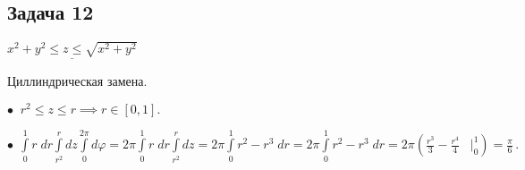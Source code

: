 \documentclass[a4paper, fleqn]{article}
\begin{document}
    \subsection*{Задача 12}
    
    $\underline{x^2 + y^2 \leq z \leq \sqrt{x^2 + y^2}}$
    
    Циллиндрическая замена.
    
    $\bullet \; \; r^2 \leq z \leq r \implies r \in [0, 1].$
    
    $\bullet \; \, \int\limits_{0}^{1} r \; dr \int\limits_{r^2}^{r} dz \int\limits_{0}^{2 \pi} d \varphi =  2 \pi  \int\limits_{0}^{1} r \; dr \int\limits_{r^2}^{r} dz  =
      2 \pi  \int\limits_{0}^{1} r^2 - r^3 \; dr = 2 \pi  \int\limits_{0}^{1} r^2 - r^3 \; dr = 2 \pi \left( \frac{r^3}{3} - \frac{r^4}{4} \; \; \;
      \Bigg|_{0}^{1} \right) = \boxed{\frac{\pi}{6}} \, .$
    
    
    
\end{document}
